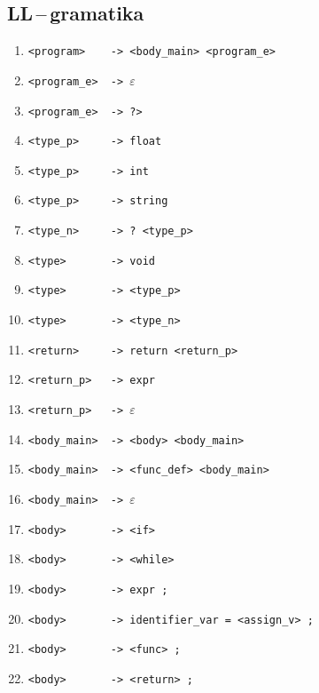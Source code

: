 \documentclass[a4paper,12pt]{article}
\begin{document}
\subsection{LL\,--\,gramatika}
\begin{table}[!ht]
	\centering
	\begin{enumerate}[noitemsep]
		\item \verb|<program>    -> <body_main> <program_e>|
		      		      		      		      		      		      		      	   
		\item \verb|<program_e>  -> |$\varepsilon$
		\item \verb|<program_e>  -> ?>|
		      		      		      		      		    		      		      		    
		\item \verb|<type_p>     -> float|
		\item \verb|<type_p>     -> int|
		\item \verb|<type_p>     -> string|
		\item \verb|<type_n>     -> ? <type_p>|
		\item \verb|<type>       -> void|
		\item \verb|<type>       -> <type_p>|
		\item \verb|<type>       -> <type_n>|
		      		      		      		      		      	      		      	      
		\item \verb|<return>     -> return <return_p>|
		\item \verb|<return_p>   -> expr|
		\item \verb|<return_p>   -> |$\varepsilon$
		      		      		      		      		      	      		      		    
		\item \verb|<body_main>  -> <body> <body_main>|
		\item \verb|<body_main>  -> <func_def> <body_main>|
		\item \verb|<body_main>  -> |$\varepsilon$
		      		      		      		      		      		      		      	    
		\item \verb|<body>       -> <if>|
		\item \verb|<body>       -> <while>|
		\item \verb|<body>       -> expr ;|
		\item \verb|<body>       -> identifier_var = <assign_v> ;|
		\item \verb|<body>       -> <func> ;|
		\item \verb|<body>       -> <return> ;|
		      		      		      		      		              

\end{enumerate}
\end{table}
\end{document}
